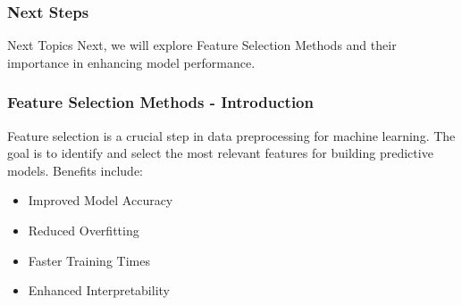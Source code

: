 \documentclass[aspectratio=169]{beamer}
\begin{document}
\begin{frame}[fragile]
    \frametitle{Next Steps}
    \begin{block}{Next Topics}
        Next, we will explore Feature Selection Methods and their importance in enhancing model performance.
    \end{block}
\end{frame}

\begin{frame}[fragile]
    \frametitle{Feature Selection Methods - Introduction}
    Feature selection is a crucial step in data preprocessing for machine learning. The goal is to identify and select the most relevant features for building predictive models. Benefits include:
    \begin{itemize}
        \item Improved Model Accuracy
        \item Reduced Overfitting
        \item Faster Training Times
        \item Enhanced Interpretability
    \end{itemize}
\end{frame}
\end{document}
